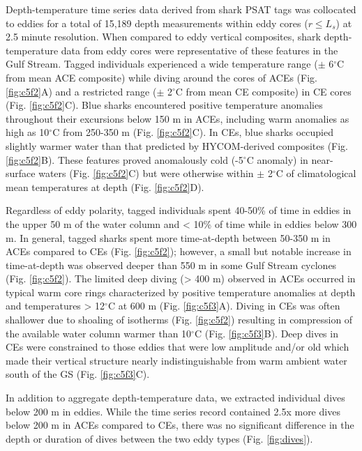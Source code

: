 Depth-temperature time series data derived from shark PSAT tags was collocated to eddies for a total of 15,189 depth measurements within eddy cores ($r \leq L_s$) at 2.5 minute resolution. When compared to eddy vertical composites, shark depth-temperature data from eddy cores were representative of these features in the Gulf Stream. Tagged individuals experienced a wide temperature range ($\pm$ 6$^\circ$C from mean ACE composite) while diving around the cores of ACEs (Fig. \cref{fig:c5f2}A) and a restricted range ($\pm$ 2$^\circ$C from mean CE composite) in CE cores (Fig. \cref{fig:c5f2}C). Blue sharks encountered positive temperature anomalies throughout their excursions below 150 m in ACEs, including warm anomalies as high as 10$^\circ$C from 250-350 m (Fig. \cref{fig:c5f2}C). In CEs, blue sharks occupied slightly warmer water than that predicted by HYCOM-derived composites (Fig. \cref{fig:c5f2}B). These features proved anomalously cold (-5$^\circ$C anomaly) in near-surface waters (Fig. \cref{fig:c5f2}C) but were otherwise within $\pm$ 2$^\circ$C of climatological mean temperatures at depth (Fig. \cref{fig:c5f2}D). 

Regardless of eddy polarity, tagged individuals spent 40-50\% of time in eddies in the upper 50 m of the water column and < 10\% of time while in eddies below 300 m. In general, tagged sharks spent more time-at-depth between 50-350 m in ACEs compared to CEs (Fig. \cref{fig:c5f2}); however, a small but notable increase in time-at-depth was observed deeper than 550 m in some Gulf Stream cyclones (Fig. \cref{fig:c5f2}). The limited deep diving (> 400 m) observed in ACEs occurred in typical warm core rings characterized by positive temperature anomalies at depth and temperatures > 12$^\circ$C at 600 m (Fig. \cref{fig:c5f3}A). Diving in CEs was often shallower due to shoaling of isotherms (Fig. \cref{fig:c5f2}) resulting in compression of the available water column warmer than 10$^\circ$C (Fig. \cref{fig:c5f3}B). Deep dives in CEs were constrained to those eddies that were low amplitude and/or old which made their vertical structure nearly indistinguishable from warm ambient water south of the GS (Fig. \cref{fig:c5f3}C).

In addition to aggregate depth-temperature data, we extracted individual dives below 200 m in eddies. While the time series record contained 2.5x more dives below 200 m in ACEs compared to CEs, there was no significant difference in the depth or duration of dives between the two eddy types (Fig. \cref{fig:dives}).

